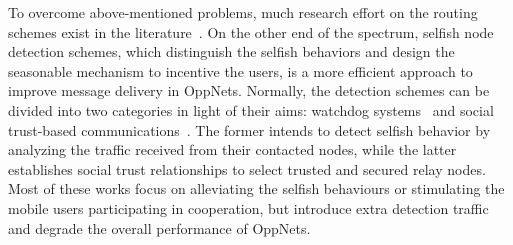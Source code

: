 To overcome above-mentioned problems,
much research effort on the routing schemes
exist in the literature~\cite{DBLP:journals/tpds/ZhuDGDC14,
DBLP:conf/mobicom/MartiGLB00,
DBLP:journals/tmc/LoretiB20}.
On the other end of the spectrum,
selfish node detection schemes,
which distinguish the selfish behaviors
and design the seasonable mechanism to
incentive the users,
is a more efficient approach to improve
message delivery in OppNets.
%
Normally,
the detection schemes
can be divided into two categories
in light of their aims:
watchdog systems~\cite{DBLP:journals/tmc/Hernandez-Orallo15,
DBLP:journals/tie/DiasRXM15,
DBLP:journals/fgcs/JedariXCDTA19}
and social trust-based communications~\cite{DBLP:journals/tdsc/ChoC18,
DBLP:conf/sigcomm/SouzaMSMCC16,
DBLP:journals/tmc/ChoiSLW12}.
The former intends to detect selfish behavior
by analyzing the traffic received
from their contacted nodes,
while the latter establishes social trust relationships
to select trusted and secured relay nodes.
Most of these works
focus on alleviating the selfish behaviours
or stimulating the mobile users participating in cooperation,
but introduce extra detection traffic 
and degrade the overall performance of OppNets.

